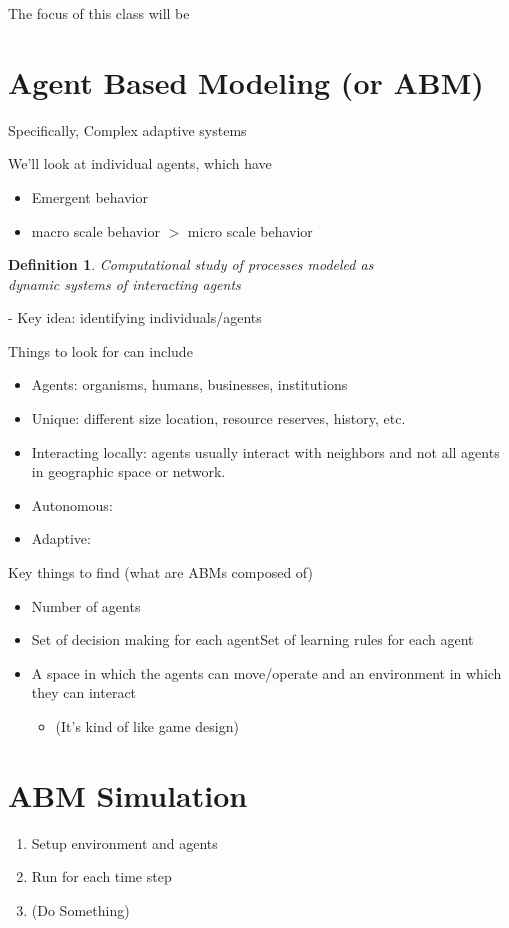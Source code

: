 \documentclass[12pt]{book}
\newtheorem*{defn*}{Definition}
\begin{document}
\vspace{50pt}
The focus of this class will be
\section{Agent Based Modeling (or ABM)}
Specifically, Complex adaptive systems

We'll look at individual agents, which have
\begin{itemize}
	\item Emergent behavior
	\item macro scale behavior $>$ micro scale behavior\\
\end{itemize}


\begin{defn*}
Computational study of processes modeled as\\ dynamic systems of interacting agents
\end{defn*}
-   Key idea: identifying individuals/agents


\newpage
\noindent Things to look for can include
\begin{itemize}
	\item Agents: organisms, humans, businesses, institutions
	\item Unique: different size location, resource reserves, history, etc.
	\item Interacting locally: agents usually interact with neighbors and not all agents in geographic space or network.
	\item Autonomous:
	\item Adaptive:
\end{itemize}

\noindent Key things to find (what are ABMs composed of)
\begin{itemize} 
	\item Number of agents
	\item Set of decision making for each agentSet of learning rules for each agent
	\item A space in which the agents can move/operate and an environment in which they can interact
	\begin{itemize} 
		\item(It's kind of like game design)
	\end{itemize}
\end{itemize}



\section{ABM Simulation}
\begin{enumerate}
	\item Setup environment and agents
	\item Run for each time step
	\item (Do Something)
\end{enumerate}
\end{document}
